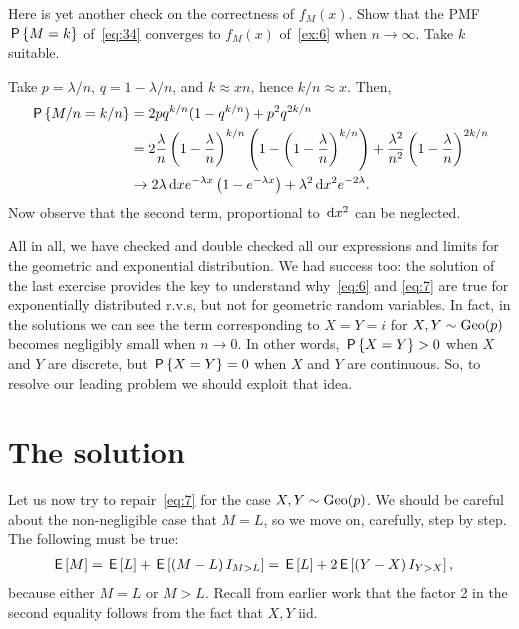 \documentclass[a4paper,11pt]{article}
\begin{document}
\begin{exercise}
Here is yet another check on the correctness of $f_M(x)$.
Show that  the PMF $\P{M=k}$ of~\cref{eq:34} converges to $f_M(x)$ of~\cref{ex:6} when $n\to \infty$. Take $k$ suitable.
\begin{solution} Take $p=\lambda/n$,  $q=1-\lambda/n$, and $k \approx x n$, hence $k/n \approx x$. Then,
  \begin{align}
    \label{eq:31}
\P{M/n=k/n}
&= 2 p q^{k/n}(1-q^{k/n}) + p^2q^{2k/n} \\
&= 2 \frac \lambda n \left(1-\frac \lambda n\right)^{k/n}\left(1-\left(1-\frac \lambda n\right)^{k/n}\right) + \frac{\lambda^2}{n^2}\left(1-\frac \lambda n \right)^{2k/n} \\
&\to 2 \lambda \d x e^{-\lambda x} \left(1 - e^{-\lambda x}\right) + \lambda^{2} \d x^{2}e^{-2\lambda}.\label{eq:37}
  \end{align}
Now observe that the second term, proportional to $\d x^{2}$ can be neglected.
\end{solution}
\end{exercise}

All in all, we have checked and double checked all our expressions and limits for the geometric and exponential distribution.
We had success too: the solution of the last exercise provides the key to understand why~\eqref{eq:6} and \eqref{eq:7} are true for exponentially distributed r.v.s, but not for geometric random variables.
In fact, in the solutions we can see the term corresponding to $X=Y=i$ for $X,Y\sim \Geo{p}$ becomes negligibly small when $n\to 0$.
In other words, $\P{X=Y}>0$  when $X$ and $Y$ are discrete, but $\P{X=Y}=0$ when  $X$ and $Y$ are continuous.
So, to resolve our leading problem we should exploit that idea.

\section{The solution}
\label{sec:solution}


Let us now try to repair~\cref{eq:7}  for the case $X,Y\sim\Geo{p}$. We should be careful about the non-negligible case that $M=L$, so we move on, carefully, step by step. The following must be true:
\begin{align}
  \label{eq:40}
\E M &= \E L + \E{(M-L) \1{M>L}}  = \E L + 2\E{(Y-X) \1{Y>X}},
\end{align}
because either $M=L$ or $M>L$.
Recall from earlier work that the factor 2 in the second equality follows from the fact that $X,Y$ iid.
\end{document}
